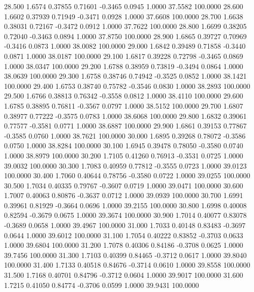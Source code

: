   28.500   1.6574   0.37855   0.71601  -0.3465   0.0945   1.0000  37.5582 100.0000
  28.600   1.6602   0.37939   0.71949  -0.3471   0.0928   1.0000  37.6608 100.0000
  28.700   1.6638   0.38031   0.72167  -0.3472   0.0912   1.0000  37.7622 100.0000
  28.800   1.6699   0.38205   0.72040  -0.3463   0.0894   1.0000  37.8750 100.0000
  28.900   1.6865   0.39727   0.70969  -0.3416   0.0873   1.0000  38.0082 100.0000
  29.000   1.6842   0.39489   0.71858  -0.3440   0.0871   1.0000  38.0187 100.0000
  29.100   1.6817   0.39228   0.72798  -0.3465   0.0869   1.0000  38.0347 100.0000
  29.200   1.6788   0.38959   0.73819  -0.3494   0.0864   1.0000  38.0639 100.0000
  29.300   1.6758   0.38746   0.74942  -0.3525   0.0852   1.0000  38.1421 100.0000
  29.400   1.6753   0.38740   0.75782  -0.3546   0.0830   1.0000  38.2893 100.0000
  29.500   1.6766   0.38813   0.76342  -0.3558   0.0812   1.0000  38.4110 100.0000
  29.600   1.6785   0.38895   0.76811  -0.3567   0.0797   1.0000  38.5152 100.0000
  29.700   1.6807   0.38977   0.77222  -0.3575   0.0783   1.0000  38.6068 100.0000
  29.800   1.6832   0.39061   0.77577  -0.3581   0.0771   1.0000  38.6887 100.0000
  29.900   1.6861   0.39153   0.77867  -0.3585   0.0760   1.0000  38.7621 100.0000
  30.000   1.6895   0.39268   0.78072  -0.3586   0.0750   1.0000  38.8284 100.0000
  30.100   1.6945   0.39478   0.78050  -0.3580   0.0740   1.0000  38.8979 100.0000
  30.200   1.7105   0.41260   0.76913  -0.3531   0.0725   1.0000  39.0032 100.0000
  30.300   1.7083   0.40959   0.77812  -0.3555   0.0723   1.0000  39.0123 100.0000
  30.400   1.7060   0.40644   0.78756  -0.3580   0.0722   1.0000  39.0255 100.0000
  30.500   1.7034   0.40335   0.79767  -0.3607   0.0719   1.0000  39.0471 100.0000
  30.600   1.7007   0.40063   0.80876  -0.3637   0.0712   1.0000  39.0939 100.0000
  30.700   1.6991   0.39961   0.81929  -0.3664   0.0696   1.0000  39.2155 100.0000
  30.800   1.6998   0.40008   0.82594  -0.3679   0.0675   1.0000  39.3674 100.0000
  30.900   1.7014   0.40077   0.83078  -0.3689   0.0658   1.0000  39.4967 100.0000
  31.000   1.7033   0.40148   0.83483  -0.3697   0.0644   1.0000  39.6012 100.0000
  31.100   1.7054   0.40222   0.83852  -0.3703   0.0633   1.0000  39.6804 100.0000
  31.200   1.7078   0.40306   0.84186  -0.3708   0.0625   1.0000  39.7456 100.0000
  31.300   1.7103   0.40399   0.84465  -0.3712   0.0617   1.0000  39.8040 100.0000
  31.400   1.7133   0.40518   0.84676  -0.3714   0.0610   1.0000  39.8558 100.0000
  31.500   1.7168   0.40701   0.84796  -0.3712   0.0604   1.0000  39.9017 100.0000
  31.600   1.7215   0.41050   0.84774  -0.3706   0.0599   1.0000  39.9431 100.0000
